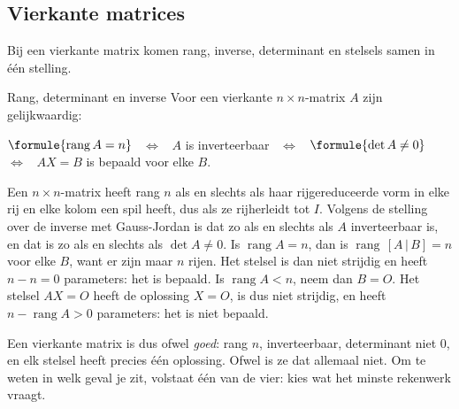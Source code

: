 \subsection{Vierkante matrices}

Bij een vierkante matrix komen rang, inverse, determinant en stelsels samen in één stelling.

\begin{theorie}
\begin{stelling}{Rang, determinant en inverse}
Voor een vierkante $n \times n$-matrix $A$ zijn gelijkwaardig:

\vspace{1mm}
\qquad $\formule{\operatorname{rang} A = n}$ \ $\iff$ \ $A$ is inverteerbaar \ $\iff$ \ $\formule{\det A \neq 0}$ \ $\iff$ \ $AX = B$ is bepaald voor elke $B$.
\end{stelling}

\begin{bewijs}
Een $n \times n$-matrix heeft rang $n$ als en slechts als haar rijgereduceerde vorm in elke rij en elke kolom een spil heeft, dus als ze rijherleidt tot $I$. Volgens de stelling over de inverse met Gauss-Jordan is dat zo als en slechts als $A$ inverteerbaar is, en dat is zo als en slechts als $\det A \neq 0$.
Is $\operatorname{rang} A = n$, dan is $\operatorname{rang}\,[A \,|\, B] = n$ voor elke $B$, want er zijn maar $n$ rijen. Het stelsel is dan niet strijdig en heeft $n - n = 0$ parameters: het is bepaald. Is $\operatorname{rang} A < n$, neem dan $B = O$. Het stelsel $AX = O$ heeft de oplossing $X = O$, is dus niet strijdig, en heeft $n - \operatorname{rang} A > 0$ parameters: het is niet bepaald.
\end{bewijs}
\end{theorie}

Een vierkante matrix is dus ofwel \textit{goed}: rang $n$, inverteerbaar, determinant niet 0, en elk stelsel heeft precies één oplossing. Ofwel is ze dat allemaal niet. Om te weten in welk geval je zit, volstaat één van de vier: kies wat het minste rekenwerk vraagt.

